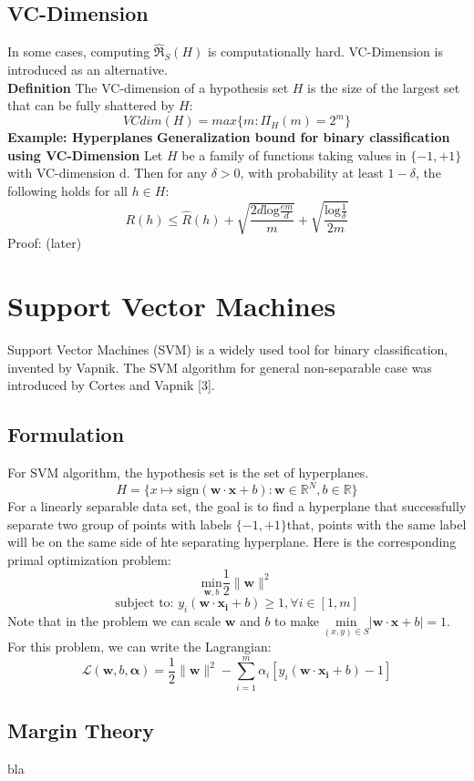 \documentclass[12pt]{article}
\theoremstyle{definition}
\theoremstyle{remark}
\numberwithin{equation}{section}
\begin{document}
\subsection{VC-Dimension}
In some cases, computing $\mathfrak{\widehat{R}}_S(H)$ is computationally hard. VC-Dimension is introduced as an alternative. \\[0.2cm]
\textbf{Definition}
The VC-dimension of a hypothesis set $H$ is the size of the largest set that can be fully shattered by $H$:
\[VCdim(H) = max\{m:\Pi_H(m) = 2^m\}\]
\textbf{Example: Hyperplanes}
\textbf{Generalization bound for binary classification using VC-Dimension}
Let $H$ be a family of functions taking values in $\{-1,+1\}$ with VC-dimension d. Then for any $\delta > 0$, with probability at least $1-\delta$, the following holds for all $h \in H$:
\[R(h) \leq \widehat{R}(h) + \sqrt{\frac{2d\mathrm{log}\frac{em}{d}}{m}} + \sqrt{\frac{\mathrm{log}\frac{1}{\delta}}{2m}}\]
Proof: (later) 
\section{Support Vector Machines}
Support Vector Machines (SVM) is a widely used tool for binary classification, invented by Vapnik. The SVM algorithm for general non-separable case was introduced by Cortes and Vapnik [3].  
\subsection{Formulation}
For SVM algorithm, the hypothesis set is the set of hyperplanes.
\[H = \{x\mapsto \mathrm{sign}(\mathbf{w\cdot x}+b): \mathbf{w} \in \mathbb{R}^N, b \in \mathbb{R} \}\] 
For a linearly separable data set, the goal is to find a hyperplane that successfully separate two group of points with labels $\{-1,+1\}$that, points with the same label will be on the same side of hte separating hyperplane. Here is the corresponding primal optimization problem: 
\[\underset{\mathbf{w}, b}{\mathrm{min}} \frac{1}{2}\|\mathbf{w}\|^2\]
\[\text{subject to: } y_i(\mathbf{w\cdot x_i}+b) \geq 1, \forall i \in [1,m]\] 
Note that in the problem we can scale $\mathbf{w}$ and $b$ to make $\underset{(x,y)\in S}{\mathrm{min}}|\mathbf{w\cdot x}+b| =1 $.
For this problem, we can write the Lagrangian:
\[\mathcal{L}(\mathbf{w},b,\mathbf{\alpha})=\frac{1}{2}\|\mathbf{w}\|^2-\sum_{i=1}^{m}\alpha_i [y_i(\mathbf{w\cdot x_i}+b)-1]\]
\subsection{Margin Theory}
bla
\end{document}
